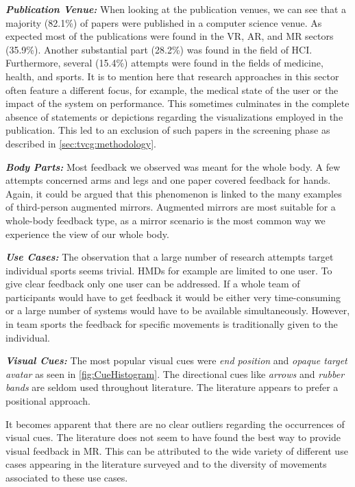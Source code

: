 \textbf{\emph{Publication Venue:}} When looking at the publication venues, we can see that a majority (82.1\%) of papers were published in a computer science venue. As expected most of the publications were found in the VR, AR, and MR sectors (35.9\%). Another substantial part (28.2\%) was found in the field of HCI. Furthermore, several (15.4\%) attempts were found in the fields of medicine, health, and sports. It is to mention here that research approaches in this sector often feature a different focus, for example, the medical state of the user or the impact of the system on performance. This sometimes culminates in the complete absence of statements or depictions regarding the visualizations employed in the publication. This led to an exclusion of such papers in the screening phase as described in \autoref{sec:tvcg:methodology}.

\textbf{\emph{Body Parts:}} Most feedback we observed was meant for the whole body. A few attempts concerned arms and legs and one paper covered feedback for hands. Again, it could be argued that this phenomenon is linked to the many examples of third-person augmented mirrors. Augmented mirrors are most suitable for a whole-body feedback type, as a mirror scenario is the most common way we experience the view of our whole body.

\textbf{\emph{Use Cases:}} The observation that a large number of research attempts target individual sports seems trivial. HMDs for example are limited to one user. To give clear feedback only one user can be addressed. If a whole team of participants would have to get feedback it would be either very time-consuming or a large number of systems would have to be available simultaneously. However, in team sports the feedback for specific movements is traditionally given to the individual.

\textbf{\emph{Visual Cues:}} The most popular visual cues were \emph{end position} and \emph{opaque target avatar} as seen in \autoref{fig:CueHistogram}. The directional cues like \emph{arrows} and \emph{rubber bands} are seldom used throughout literature. The literature appears to prefer a positional approach.

It becomes apparent that there are no clear outliers regarding the occurrences of visual cues. The literature does not seem to have found the best way to provide visual feedback in MR. This can be attributed to the wide variety of different use cases appearing in the literature surveyed and to the diversity of movements associated to these use cases.

